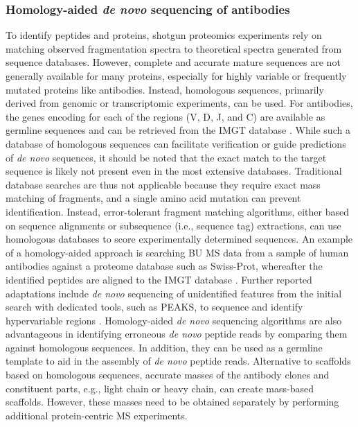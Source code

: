 \subsubsection{Homology-aided \emph{de novo} sequencing of antibodies}
To identify peptides and proteins, shotgun proteomics experiments rely on matching observed fragmentation spectra to theoretical spectra generated from sequence databases. However, complete and accurate mature sequences are not generally available for many proteins, especially for highly variable or frequently mutated proteins like antibodies. Instead, homologous sequences, primarily derived from genomic or transcriptomic experiments, can be used. For antibodies, the genes encoding for each of the regions (V, D, J, and C) are available as germline sequences and can be retrieved from the IMGT database \cite{lefranc2003imgt, lefranc2020immunoglobulins}. While such a database of homologous sequences can facilitate verification or guide predictions of \emph{de novo} sequences, it should be noted that the exact match to the target sequence is likely not present even in the most extensive databases. Traditional database searches are thus not applicable because they require exact mass matching of fragments, and a single amino acid mutation can prevent identification. Instead, error-tolerant fragment matching algorithms, either based on sequence alignments or subsequence (i.e., sequence tag) extractions, can use homologous databases to score experimentally determined sequences.
An example of a homology-aided approach is searching BU MS data from a sample of human antibodies against a proteome database such as Swiss-Prot, whereafter the identified peptides are aligned to the IMGT database \cite{schmelter2017peptides, singh2013cerebrospinal-fluid-derived}. Further reported adaptations include \emph{de novo} sequencing of unidentified features from the initial search with dedicated tools, such as PEAKS, to sequence and identify hypervariable regions \cite{broodman2012mass, costa2010sequencing}. Homology-aided \emph{de novo} sequencing algorithms are also advantageous in identifying erroneous \emph{de novo} peptide reads by comparing them against homologous sequences. In addition, they can be used as a germline template to aid in the assembly of \emph{de novo} peptide reads. Alternative to scaffolds based on homologous sequences, accurate masses of the antibody clones and constituent parts, e.g., light chain or heavy chain, can create mass-based scaffolds. However, these masses need to be obtained separately by performing additional protein-centric MS experiments.

